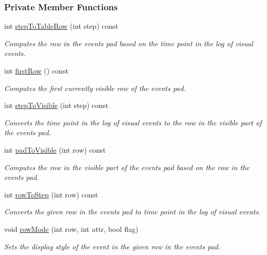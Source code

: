 \subsubsection*{Private Member Functions}
\begin{DoxyCompactItemize}
\item 
int \hyperlink{structLogWindow_aa27ae2ea24c3829895e1330d82a9f063}{step\+To\+Table\+Row} (int step) const 
\begin{DoxyCompactList}\small\item\em Computes the row in the events pad based on the time point in the log of visual events. \end{DoxyCompactList}\item 
int \hyperlink{structLogWindow_a18de4950c690191da1ce2b2d00e93a79}{first\+Row} () const 
\begin{DoxyCompactList}\small\item\em Computes the first currently visible row of the events pad. \end{DoxyCompactList}\item 
int \hyperlink{structLogWindow_ad03b4dd16142e26573875287dd9f06bd}{step\+To\+Visible} (int step) const 
\begin{DoxyCompactList}\small\item\em Converts the time point in the log of visual events to the row in the visible part of the events pad. \end{DoxyCompactList}\item 
int \hyperlink{structLogWindow_a61046639f9aace7764b8930e263122cc}{pad\+To\+Visible} (int row) const 
\begin{DoxyCompactList}\small\item\em Computes the row in the visible part of the events pad based on the row in the events pad. \end{DoxyCompactList}\item 
int \hyperlink{structLogWindow_aa3bf0f930e8de11939851ee351c7f07d}{row\+To\+Step} (int row) const 
\begin{DoxyCompactList}\small\item\em Converts the given row in the events pad to time point in the log of visual events. \end{DoxyCompactList}\item 
void \hyperlink{structLogWindow_affe574f5714380dc5b4eb028cd370224}{row\+Mode} (int row, int attr, bool flag)
\begin{DoxyCompactList}\small\item\em Sets the display style of the event in the given row in the events pad. \end{DoxyCompactList}\item 

\end{DoxyCompactItemize}
